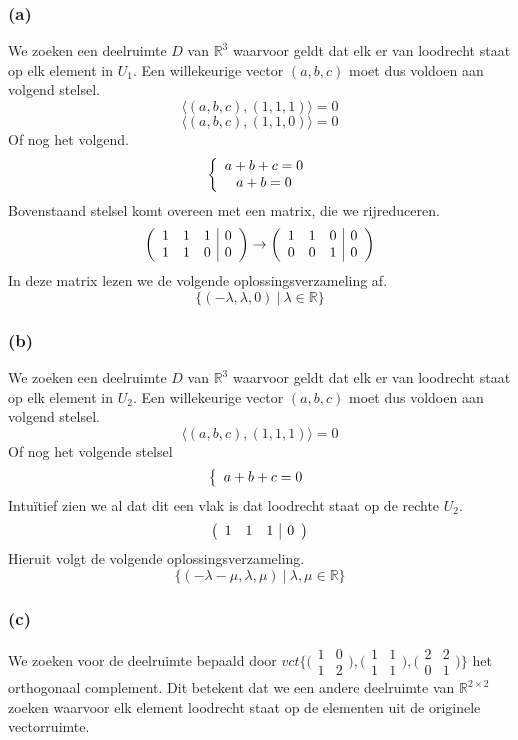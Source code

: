 \documentclass[lineaire_algebra_oplossingen.tex]{subfiles}
\begin{document}
\subsubsection*{(a)}
We zoeken een deelruimte $D$ van $\mathbb{R}^3$ waarvoor geldt dat elk er van loodrecht staat op elk element in $U_1$. Een willekeurige vector $(a,b,c)$ moet dus voldoen aan volgend stelsel.
\[
\langle (a,b,c),(1,1,1)\rangle = 0
\]
\[
\langle (a,b,c),(1,1,0)\rangle = 0
\]
Of nog het volgend.
\[
\left\{
\begin{array}{c c}
a+b+c=0\\
a+b=0
\end{array}
\right.
\]
Bovenstaand stelsel komt overeen met een matrix, die we rijreduceren.
\[
\left(
\begin{array}{c c c  | c}
1&1&1&0\\
1&1&0&0
\end{array}
\right)
\rightarrow
\left(
\begin{array}{c c c  | c}
1&1&0&0\\
0&0&1&0
\end{array}
\right)
\]
In deze matrix lezen we de volgende oplossingsverzameling af.
\[
\{ (-\lambda,\lambda,0)\ |\ \lambda\in\mathbb{R}\}
\]


\subsubsection*{(b)}
We zoeken een deelruimte $D$ van $\mathbb{R}^3$ waarvoor geldt dat elk er van loodrecht staat op elk element in $U_2$. Een willekeurige vector $(a,b,c)$ moet dus voldoen aan volgend stelsel.
\[
\langle (a,b,c),(1,1,1)\rangle = 0
\]
Of nog het volgende stelsel
\[
\left\{
\begin{array}{c c}
a + b + c = 0 
\end{array}
\right.
\]
Intu\"itief zien we al dat dit een vlak is dat loodrecht staat op de rechte $U_2$.
\[
\left(
\begin{array}{c c c | c}
1 & 1 & 1 & 0 
\end{array}
\right)
\]
Hieruit volgt de volgende oplossingsverzameling.
\[
\{ (-\lambda - \mu , \lambda, \mu)\ |\ \lambda,\mu \in \mathbb{R}\}
\]


\subsubsection*{(c)}
We zoeken voor de deelruimte bepaald door $vct\{\bigl(\begin{smallmatrix}
1 & 0 \\
1 & 2
\end{smallmatrix}\bigr),\bigl(\begin{smallmatrix}
1 & 1 \\
1 & 1
\end{smallmatrix}\bigr),\bigl(\begin{smallmatrix}
2 & 2 \\
0 & 1
\end{smallmatrix}\bigr)\}$  het orthogonaal complement. Dit betekent dat we een andere deelruimte van $\mathbb{R}^{2\times2}$ zoeken waarvoor elk element loodrecht staat op de elementen uit de originele vectorruimte.
\end{document}
